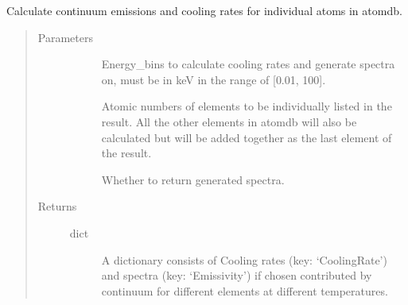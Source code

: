 \documentclass[letterpaper,10pt,english]{sphinxmanual}
\begin{document}
\begin{fulllineitems}
\label{\detokenize{prepare_pyatomdb:modules.prepare_pyatomdb.calculate_continuum_emission}}
Calculate continuum emissions and cooling rates 
for individual atoms in atomdb.
\begin{quote}\begin{description}
\item[{Parameters}] \leavevmode\begin{description}
\item[{}] \leavevmode
Energy\_bins to calculate cooling rates and 
generate spectra on, must be in keV in the 
range of {[}0.01, 100{]}.

\item[{}] \leavevmode
Atomic numbers of elements to be individually 
listed in the result. All the other elements 
in atomdb will also be calculated but will be 
added together as the last element of the result.

\item[{}] \leavevmode
Whether to return generated spectra.

\end{description}

\item[{Returns}] \leavevmode\begin{description}
\item[{dict}] \leavevmode
A dictionary consists of Cooling rates (key: ‘CoolingRate’) 
and spectra (key: ‘Emissivity’) if chosen contributed 
by continuum for different elements at different temperatures.

\end{description}

\end{description}\end{quote}

\end{fulllineitems}

\end{document}

